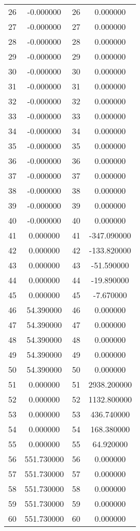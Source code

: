 \documentclass[12pt]{article}
\begin{document}
\begin{longtable}{@{}cccc@{}}
26 & -0.000000 & 26 & 0.000000 \\
27 & -0.000000 & 27 & 0.000000 \\
28 & -0.000000 & 28 & 0.000000 \\
29 & -0.000000 & 29 & 0.000000 \\
30 & -0.000000 & 30 & 0.000000 \\
31 & -0.000000 & 31 & 0.000000 \\
32 & -0.000000 & 32 & 0.000000 \\
33 & -0.000000 & 33 & 0.000000 \\
34 & -0.000000 & 34 & 0.000000 \\
35 & -0.000000 & 35 & 0.000000 \\
36 & -0.000000 & 36 & 0.000000 \\
37 & -0.000000 & 37 & 0.000000 \\
38 & -0.000000 & 38 & 0.000000 \\
39 & -0.000000 & 39 & 0.000000 \\
40 & -0.000000 & 40 & 0.000000 \\
41 & 0.000000 & 41 & -347.090000 \\
42 & 0.000000 & 42 & -133.820000 \\
43 & 0.000000 & 43 & -51.590000 \\
44 & 0.000000 & 44 & -19.890000 \\
45 & 0.000000 & 45 & -7.670000 \\
46 & 54.390000 & 46 & 0.000000 \\
47 & 54.390000 & 47 & 0.000000 \\
48 & 54.390000 & 48 & 0.000000 \\
49 & 54.390000 & 49 & 0.000000 \\
50 & 54.390000 & 50 & 0.000000 \\
51 & 0.000000 & 51 & 2938.200000 \\
52 & 0.000000 & 52 & 1132.800000 \\
53 & 0.000000 & 53 & 436.740000 \\
54 & 0.000000 & 54 & 168.380000 \\
55 & 0.000000 & 55 & 64.920000 \\
56 & 551.730000 & 56 & 0.000000 \\
57 & 551.730000 & 57 & 0.000000 \\
58 & 551.730000 & 58 & 0.000000 \\
59 & 551.730000 & 59 & 0.000000 \\
60 & 551.730000 & 60 & 0.000000 \\

\end{longtable}
\end{document}
